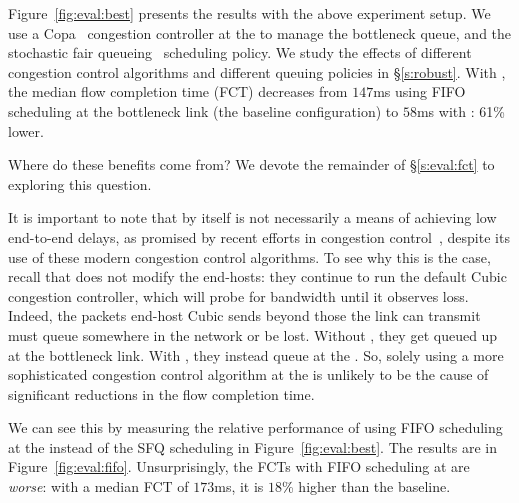Figure~\ref{fig:eval:best} presents the results with the above experiment setup.
We use a Copa~\cite{copa} congestion controller at the \inbox to manage the bottleneck queue, and the stochastic fair queueing~\cite{sfq} scheduling policy. 
We study the effects of different congestion control algorithms and different queuing policies in \S\ref{s:robust}.
With \name, the median flow completion time (FCT) decreases from $147$ms using FIFO scheduling at the bottleneck link (the baseline configuration) to $58$ms with \name: 61\% lower.

\vspace{10pt}
\noindent Where do these benefits come from? We devote the remainder of \S\ref{s:eval:fct}  to exploring this question.

 It is important to note that \name by itself is not necessarily a means of achieving low end-to-end delays, as promised by recent efforts in congestion control~\cite{copa, nimbus}, despite its use of these modern congestion control algorithms. 
To see why this is the case, recall that \name does not modify the end-hosts: they continue to run the default Cubic congestion controller, which will probe for bandwidth until it observes loss.
Indeed, the packets end-host Cubic sends beyond those the link can transmit must queue somewhere in the network or be lost. Without \name, they get queued up at the bottleneck link.
With \name, they instead queue at the \inbox.
So, solely using a more sophisticated congestion control algorithm at the \name is unlikely to be the cause of significant reductions in the flow completion time.



We can see this by measuring the relative performance of using FIFO scheduling at the \name instead of the SFQ scheduling in Figure~\ref{fig:eval:best}.
The results are in Figure~\ref{fig:eval:fifo}. 
Unsurprisingly, the FCTs with FIFO scheduling at \name are \emph{worse}: with a median FCT of $173$ms, it is $18$\% higher than the baseline. 




